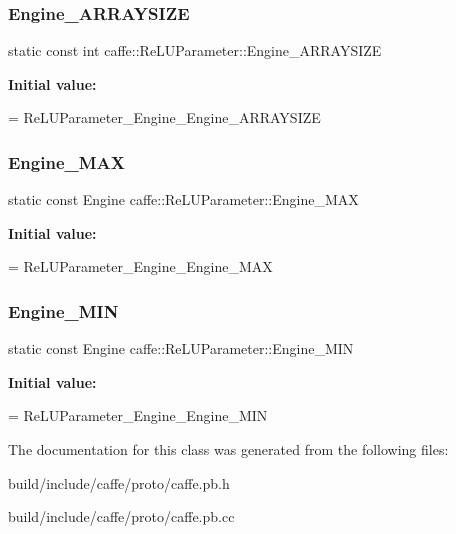 \subsubsection{\texorpdfstring{Engine\+\_\+\+A\+R\+R\+A\+Y\+S\+I\+ZE}{Engine\_ARRAYSIZE}}
{\footnotesize\ttfamily static const int caffe\+::\+Re\+L\+U\+Parameter\+::\+Engine\+\_\+\+A\+R\+R\+A\+Y\+S\+I\+ZE\hspace{0.3cm}{\ttfamily [static]}}

{\bfseries Initial value\+:}
\begin{DoxyCode}
=
    ReLUParameter\_Engine\_Engine\_ARRAYSIZE
\end{DoxyCode}
\mbox{\label{classcaffe_1_1_re_l_u_parameter_ad98768d646544e2cd547a245ff8e2fe8}} 
\subsubsection{\texorpdfstring{Engine\+\_\+\+M\+AX}{Engine\_MAX}}
{\footnotesize\ttfamily static const Engine caffe\+::\+Re\+L\+U\+Parameter\+::\+Engine\+\_\+\+M\+AX\hspace{0.3cm}{\ttfamily [static]}}

{\bfseries Initial value\+:}
\begin{DoxyCode}
=
    ReLUParameter\_Engine\_Engine\_MAX
\end{DoxyCode}
\mbox{\label{classcaffe_1_1_re_l_u_parameter_a590e1ca8e933da2a25d2f0a0f3eaed06}} 
\subsubsection{\texorpdfstring{Engine\+\_\+\+M\+IN}{Engine\_MIN}}
{\footnotesize\ttfamily static const Engine caffe\+::\+Re\+L\+U\+Parameter\+::\+Engine\+\_\+\+M\+IN\hspace{0.3cm}{\ttfamily [static]}}

{\bfseries Initial value\+:}
\begin{DoxyCode}
=
    ReLUParameter\_Engine\_Engine\_MIN
\end{DoxyCode}


The documentation for this class was generated from the following files\+:\begin{DoxyCompactItemize}
\item 
build/include/caffe/proto/caffe.\+pb.\+h\item 
build/include/caffe/proto/caffe.\+pb.\+cc\end{DoxyCompactItemize}
